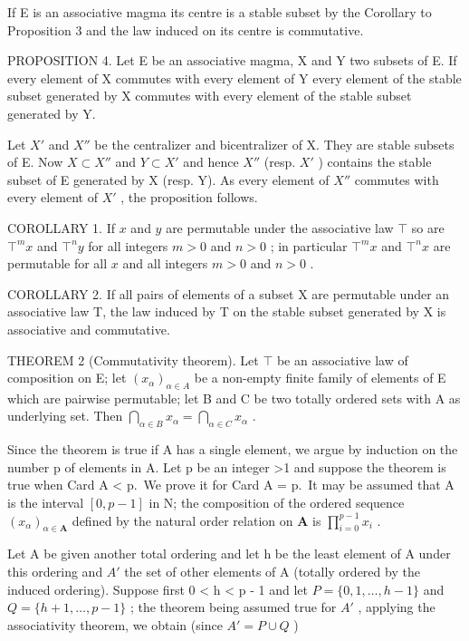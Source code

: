 If E is an associative magma its centre is a stable subset by the Corollary to Proposition 3 and the law induced on its centre is commutative.

PROPOSITION 4. Let E be an associative magma, X and Y two subsets of E. If every element of X commutes with every element of Y every element of the stable subset generated by X commutes with every element of the stable subset generated by Y.

Let \(X'\) and \(X''\) be the centralizer and bicentralizer of X. They are stable subsets of E. Now \(X \subset X''\) and \(Y \subset X'\) and hence \(X''\) (resp. \(X'\) ) contains the stable subset of E generated by X (resp. Y). As every element of \(X''\) commutes with every element of \(X'\) , the proposition follows.

COROLLARY 1. If \(x\) and \(y\) are permutable under the associative law \(\top\) so are \(\top^m x\) and \(\top^n y\) for all integers \(m > 0\) and \(n > 0\) ; in particular \(\top^m x\) and \(\top^n x\) are permutable for all \(x\) and all integers \(m > 0\) and \(n > 0\) .

COROLLARY 2. If all pairs of elements of a subset X are permutable under an associative law T, the law induced by T on the stable subset generated by X is associative and commutative.

THEOREM 2 (Commutativity theorem). Let \(\top\) be an associative law of composition on E; let \((x_{\alpha})_{\alpha \in A}\) be a non-empty finite family of elements of E which are pairwise permutable; let B and C be two totally ordered sets with A as underlying set. Then \(\bigcap_{\alpha \in B} x_{\alpha} = \bigcap_{\alpha \in C} x_{\alpha}\) .

Since the theorem is true if A has a single element, we argue by induction on the number p of elements in A. Let p be an integer \textgreater1 and suppose the theorem is true when Card A \textless{} p.~We prove it for Card A = p.~It may be assumed that A is the interval \([0, p - 1]\) in N; the composition of the ordered sequence \((x_{\alpha})_{\alpha \in \mathbf{A}}\) defined by the natural order relation on \(\mathbf{A}\) is \(\prod_{i = 0}^{p - 1}x_i\) .

Let A be given another total ordering and let h be the least element of A under this ordering and \(A'\) the set of other elements of A (totally ordered by the induced ordering). Suppose first 0 \textless{} h \textless{} p - 1 and let \(P = \{0, 1, \ldots, h - 1\}\) and \(Q = \{h + 1, \ldots, p - 1\}\) ; the theorem being assumed true for \(A'\) , applying the associativity theorem, we obtain (since \(A' = P \cup Q\) )

